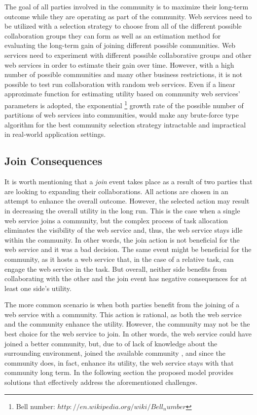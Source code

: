 \documentclass[10pt,journal,cspaper,compsoc]{IEEEtran}
\begin{document}
The goal of all parties involved in the community is to maximize their long-term outcome while they are operating as part of the community. Web services need to be utilized with a selection strategy to choose from all of the different possible collaboration groups they can form as well as an estimation method for evaluating the long-term gain of joining different possible communities. Web services need to experiment with different possible collaborative groups and other web services in order to estimate their gain over time. However, with a high number of possible communities and many other business restrictions, it is not possible to test run collaboration with random web services. Even if a linear approximate function for estimating utility based on community web services' parameters is adopted, the exponential \footnote{Bell number: $http://en.wikipedia.org/wiki/Bell_number$} growth rate of the possible number of partitions of web services into communities, would make any brute-force type algorithm for the best community selection strategy intractable and impractical in real-world application settings.

\subsection{Join Consequences}\label{s:jc}
It is worth mentioning that a \emph{join} event takes place as a result of two parties that are looking to expanding their collaborations. All actions are chosen in an attempt to enhance the overall outcome. However, the selected action may result in decreasing the overall utility in the long run. 
This is the case when a single web service joins a community, but the complex process of task allocation eliminates the visibility of the web service and, thus, the web service stays idle within the community. In other words, the join action is not beneficial for the web service and it was a bad decision. The same event might be beneficial for the community, as it hosts a web service that, in the case of a relative task, can engage the web service in the task. But overall, neither side benefits from collaborating with the other and the join event has negative consequences for at least one side's utility. 

The more common scenario is when both parties benefit from the joining of a web service with a community. This action is rational, as both the web service and the community enhance the utility. However, the community may not be the best choice for the web service to join. In other words, the web service could have joined a better community, but, due to of lack of knowledge about the surrounding environment, joined the available community , and since the community does, in fact, enhance its utility, the web service stays with that community long term. In the following section the proposed model provides solutions that effectively address the aforementioned challenges.
\end{document}
